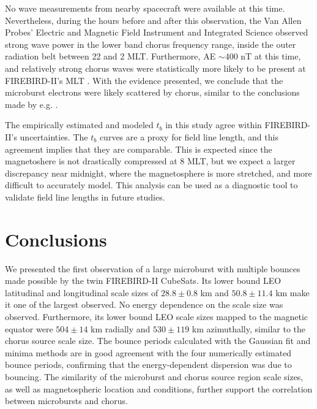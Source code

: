 \documentclass[draft, linenumbers]{agujournal}
\begin{document}
No wave measurements from nearby spacecraft were available at this time. Nevertheless, during the hours before and after this observation, the Van Allen Probes' \citep{Mauk2013} Electric and Magnetic Field Instrument and Integrated Science \citep{Kletzing2013} observed strong wave power in the lower band chorus frequency range, inside the outer radiation belt between 22 and 2 MLT. Furthermore, AE $\sim 400$ nT at this time, and relatively strong chorus waves were statistically more likely to be present at FIREBIRD-II's MLT \citep{Li2009}. With the evidence presented, we conclude that the microburst electrons were likely scattered by chorus, similar to the conclusions made by e.g. \citet{Lorentzen2001a, O'Brien2003, Breneman2017}.

The empirically estimated and modeled $t_b$ in this study agree within FIREBIRD-II's uncertainties. The $t_b$ curves are a proxy for field line length, and this agreement implies that they are comparable. This is expected since the magnetoshere is not drastically compressed at 8 MLT, but we expect a larger discrepancy near midnight, where the magnetosphere is more stretched, and more difficult to accurately model. This analysis can be used as a diagnostic tool to validate field line lengths in future studies.

\section{Conclusions}
We presented the first observation of a large microburst with multiple bounces made possible by the twin FIREBIRD-II CubeSats. Its lower bound LEO latitudinal and longitudinal scale sizes of $28.8 \pm 0.8$ km and $ 50.8 \pm 11.4$  km make it one of the largest observed. No energy dependence on the scale size was observed. Furthermore, its lower bound LEO scale sizes mapped to the magnetic equator were  $504 \pm​ 14$ km radially and $530 \pm 119$ km azimuthally, similar to the chorus source scale size. The bounce periods calculated with the Gaussian fit and minima methods are in good agreement with the four numerically estimated bounce periods, confirming that the energy-dependent dispersion was due to bouncing. The similarity of the microburst and chorus source region scale sizes, as well as magnetospheric location and conditions, further support the correlation between microbursts and chorus.




\end{document}

